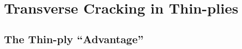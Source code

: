 \documentclass[first,firstsupp,lastsupp,last,hyperref,table]{ETHclass}
\begin{document}



\section{Transverse Cracking in Thin-plies}

\subsection{The Thin-ply ``Advantage''}
\end{document}
